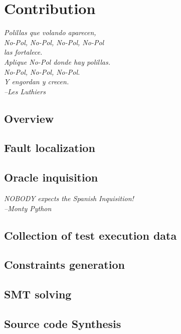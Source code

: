 \chapter{Contribution}
{\begin{small}%
\begin{flushright}%
\it
Polillas que volando aparecen, \\
No-Pol, No-Pol, No-Pol, No-Pol \\
las fortalece. \\
Aplique No-Pol donde hay polillas. \\
No-Pol, No-Pol, No-Pol. \\
Y engordan y crecen. \\
--Les Luthiers
\end{flushright}%
\end{small}%
\vspace{.5cm}}

\section{Overview}


\label{flow_graph}

\section{Fault localization}

\section{Oracle inquisition}
{\begin{small}%
\begin{flushright}%
\it
NOBODY expects the Spanish Inquisition! \\
--Monty Python
\end{flushright}%
\end{small}%
\vspace{.5cm}}

\section{Collection of test execution data}

\section{Constraints generation}

\section{SMT solving}

\section{Source code Synthesis}

